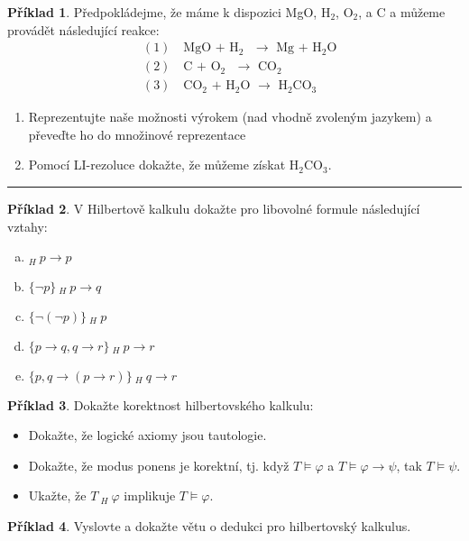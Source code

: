 \documentclass{amsart}
\theoremstyle{definition}
\newtheorem{problem}{Příklad}
\begin{document}
\begin{problem}Předpokládejme, že máme k dispozici MgO, H$_2$, O$_2$, a C a můžeme provádět následující reakce:
\begin{align*}&(1)\quad\text{MgO\ +\ H$_2$\ \ $\to$\ \ Mg\ +\ H$_2$O}\\
&(2)\quad\text{C\ +\ O$_2$\ \ $\to$\ \ CO$_2$}\\
&(3)\quad\text{CO$_2$\ +\ H$_2$O\ \ $\to$\ \ H$_2$CO$_3$}
\end{align*}
\begin{enumerate}
\item Reprezentujte naše možnosti výrokem (nad vhodně zvoleným jazykem) a převeďte ho do množinové reprezentace
\item Pomocí LI-rezoluce dokažte, že můžeme získat H$_2$CO$_3$.
\end{enumerate}
\end{problem}\medskip

\hrule

\begin{problem}
V Hilbertově kalkulu dokažte pro libovolné formule následující vztahy:
\begin{enumerate}[(a)]
\item $_H\ p\to p$
\item $\{\neg p\}\ _H\ p\to q$
\item $\{\neg(\neg p)\}\ _H\ p$
\item $\{p\to q,q \to r\}\ _H\ p\to r$
\item $\{p, q \to (p\to r)\}\ _H\ q\to r$

\end{enumerate}
\end{problem}\medskip

\begin{problem}
Dokažte korektnost hilbertovského kalkulu:
\begin{itemize}
    \item Dokažte, že logické axiomy jsou tautologie.
    \item Dokažte, že modus ponens je korektní, tj. když $T\models\varphi$ a $T\models\varphi\to\psi$, tak $T\models\psi$.
    \item Ukažte, že $T\ _H\ \varphi$ implikuje $T\models\varphi$.
\end{itemize}
\end{problem}\medskip

\begin{problem}
Vyslovte a dokažte větu o dedukci pro hilbertovský kalkulus.
\end{problem}\medskip
\end{document}

